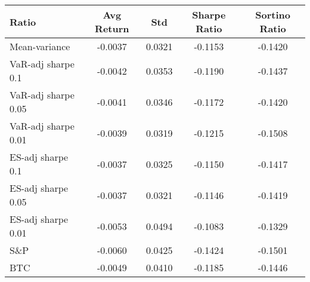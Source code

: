 \begin{tabular}{lcccc}
\toprule
Ratio & Avg Return & Std & Sharpe Ratio & Sortino Ratio\\
\midrule
Mean-variance & -0.0037 & 0.0321 & -0.1153 & -0.1420\\
VaR-adj sharpe 0.1 & -0.0042 & 0.0353 & -0.1190 & -0.1437\\
VaR-adj sharpe 0.05 & -0.0041 & 0.0346 & -0.1172 & -0.1420\\
VaR-adj sharpe 0.01 & -0.0039 & 0.0319 & -0.1215 & -0.1508\\
ES-adj sharpe 0.1 & -0.0037 & 0.0325 & -0.1150 & -0.1417\\
ES-adj sharpe 0.05 & -0.0037 & 0.0321 & -0.1146 & -0.1419\\
ES-adj sharpe 0.01 & -0.0053 & 0.0494 & -0.1083 & -0.1329\\
S\&P & -0.0060 & 0.0425 & -0.1424 & -0.1501\\
BTC & -0.0049 & 0.0410 & -0.1185 & -0.1446\\
\bottomrule
\end{tabular}

